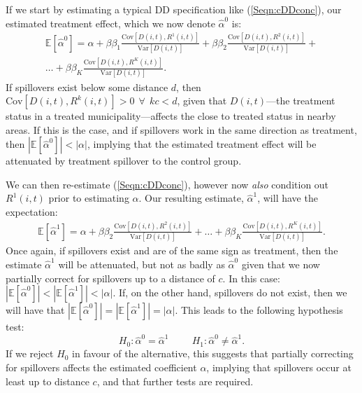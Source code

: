 \documentclass{article}
\newcommand{\Var}{\mathrm{Var}}
\newcommand{\Cov}{\mathrm{Cov}}
\newcommand{\Bias}[2]{\frac{\Cov[#1,#2]}{\Var[#1]}}
\begin{document}
\begin{spacing}{1.3}
If we start by estimating a typical DD specification like (\ref{Seqn:cDDconc}),
our estimated treatment effect, which we now denote $\hat\alpha^0$ is:
\begin{equation}
\nonumber
\begin{split}
\mathbb{E}[\hat\alpha^0]=\alpha + \beta\beta_1\Bias{D(i,t)}{R^1(i,t)}
                                + \beta\beta_2\Bias{D(i,t)}{R^2(i,t)}
                                + \\ \ldots
                                + \beta\beta_K\Bias{D(i,t)}{R^K(i,t)}.
\end{split}
\end{equation}
If spillovers exist below some distance $d$, then 
$\Cov[D(i,t),R^k(i,t)]>0 \ \ \forall \ \ kc<d$, given that $D(i,t)$---the treatment
status in a treated municipality---affects the close to treated status in nearby 
areas. If this is the case, and if 
spillovers work in the same direction as treatment, then $|\mathbb{E}[\hat\alpha^0]|
<|\alpha|$, implying that the estimated treatment effect will be attenuated by 
treatment spillover to the control group.  

We can then re-estimate (\ref{Seqn:cDDconc}), however now \emph{also} condition
out $R^1(i,t)$ prior to estimating $\alpha$.  Our resulting estimate, $\hat\alpha^1$,
will have the expectation:
\begin{equation}
\nonumber
\begin{split}
\mathbb{E}[\hat\alpha^1]=\alpha + \beta\beta_2\Bias{D(i,t)}{R^2(i,t)}
                                + \ldots
                                + \beta\beta_K\Bias{D(i,t)}{R^K(i,t)}.
\end{split}
\end{equation}
Once again, if spillovers exist and are of the same sign as treatment, then the
estimate $\hat\alpha^1$ will be attenuated, but not as badly as $\hat\alpha^0$ given
that we now partially correct for spillovers up to a distance of $c$.  In this case:
$|\mathbb{E}[\hat\alpha^0]|<|\mathbb{E}[\hat\alpha^1]|<|\alpha|$.  If, on the other
hand, spillovers do not exist, then we will have that $|\mathbb{E}[\hat\alpha^0]|=
|\mathbb{E}[\hat\alpha^1]|=|\alpha|$.  This leads to the following hypothesis test:
\[
H_0: \hat\alpha^0=\hat\alpha^1 \hspace{1cm}
H_1: \hat\alpha^0\neq\hat\alpha^1.
\]
If we reject $H_0$ in favour of the alternative, this suggests that partially 
correcting for spillovers affects the estimated coefficient $\alpha$, implying that
spillovers occur at least up to distance $c$, and that further tests are required.  


\end{spacing}
\end{document}

